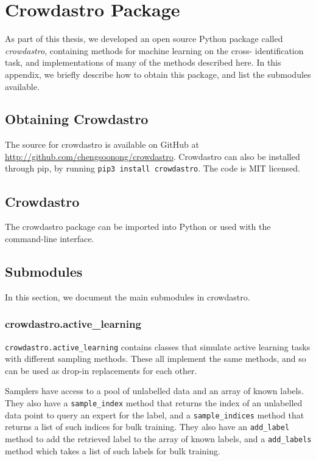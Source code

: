 
\appendix
\chapter{Crowdastro Package}
\label{cha:crowdastro}

As part of this thesis, we developed an open source Python package called
\emph{crowdastro}, containing methods for machine learning on the cross-%
identification task, and implementations of many of the methods described here.
In this appendix, we briefly describe how to obtain this package, and list the
submodules available.

\section{Obtaining Crowdastro}

    The source for crowdastro is available on GitHub at
    \url{http://github.com/chengsoonong/crowdastro}. Crowdastro can also be
    installed through pip, by running \texttt{pip3 install crowdastro}. The code
    is MIT licensed.

\section{Crowdastro}

    The crowdastro package can be imported into Python or used with the
    command-line interface.


\section{Submodules}
    \label{sec:crowdastro-submodules}

    In this section, we document the main submodules in crowdastro.

    \subsection{crowdastro.active\_learning}
    \label{sec:crowdastro-active-learning}

        \texttt{crowdastro.active\_learning} contains classes that simulate
        active learning tasks with different sampling methods. These all
        implement the same methods, and so can be used as drop-in replacements
        for each other.

        Samplers have access to a pool of unlabelled data and an array of known
        labels. They also have a \texttt{sample\_index} method that returns the
        index of an unlabelled data point to query an expert for the label, and
        a \texttt{sample\_indices} method that returns a list of such indices
        for bulk training. They also have an \texttt{add\_label} method to add
        the retrieved label to the array of known labels, and a
        \texttt{add\_labels} method which takes a list of such labels for bulk
        training.

